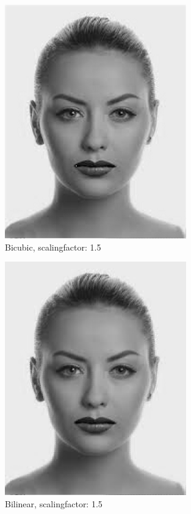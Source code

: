 \documentclass{article}
\begin{document}
   \begin{figure}[H]
      \centering
      \includegraphics[]{assets/Bicubic_Female_15.png}
      \caption{Bicubic, scalingfactor: 1.5}
      \label{fig:sub1}
    \end{figure}%
    \begin{figure}[H]
      \centering
      \includegraphics[]{assets/Bilinear_Female_15.png}
      \caption{Bilinear, scalingfactor: 1.5}
      \label{fig:sub2}
    \end{figure}
\end{document}
